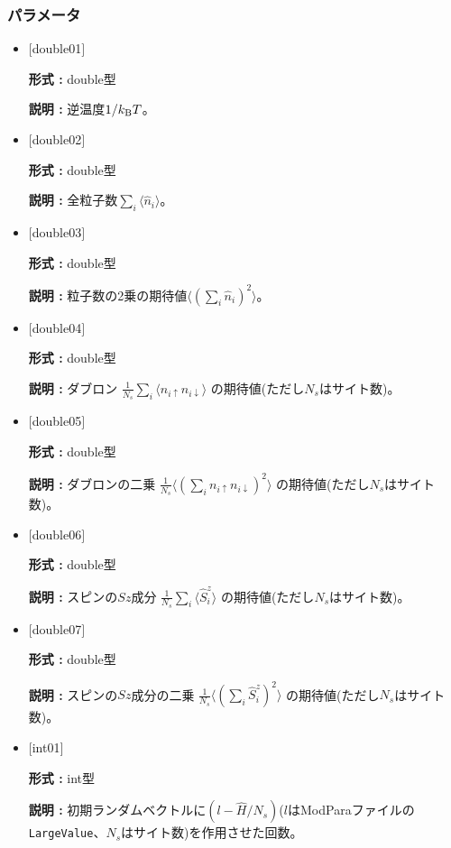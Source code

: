 \subsubsection{パラメータ}
 \begin{itemize}

  \item  $[$double01$]$
  
 {\bf 形式 :} double型

{\bf 説明 :} 逆温度$1/{k_{\rm B}T}$。
 
  \item $[$double02$]$

 {\bf 形式 :} double型 

{\bf 説明 :}  全粒子数$\sum_{i} \langle \hat{n}_i \rangle$。

  \item $[$double03$]$

 {\bf 形式 :} double型 

{\bf 説明 :} 粒子数の2乗の期待値$ \langle (\sum_{i}\hat{n}_i)^2 \rangle$。

  \item $[$double04$]$

 {\bf 形式 :} double型 

{\bf 説明 :} ダブロン
$\frac{1}{N_s} \sum_{i}\langle n_{i\uparrow}n_{i\downarrow}\rangle$ の期待値(ただし$N_s$はサイト数)。

  \item $[$double05$]$

 {\bf 形式 :} double型 

{\bf 説明 :} ダブロンの二乗
$\frac{1}{N_s} \langle (\sum_{i}n_{i\uparrow} n_{i\downarrow})^2\rangle$ の期待値(ただし$N_s$はサイト数)。

  \item $[$double06$]$

 {\bf 形式 :} double型 

{\bf 説明 :} スピンの$Sz$成分
$\frac{1}{N_s} \sum_{i}\langle \hat{S}_i^z\rangle$ の期待値(ただし$N_s$はサイト数)。

  \item $[$double07$]$

 {\bf 形式 :} double型 

{\bf 説明 :} スピンの$Sz$成分の二乗
$\frac{1}{N_s} \langle (\sum_{i} \hat{S}_i^z)^2\rangle$ の期待値(ただし$N_s$はサイト数)。

  \item $[$int01$]$

 {\bf 形式 :} int型 

{\bf 説明 :} 初期ランダムベクトルに$(l-\hat{H}/N_{s})$($l$はModParaファイルの\verb|LargeValue|、$N_{s}$はサイト数)を作用させた回数。

 \end{itemize}

